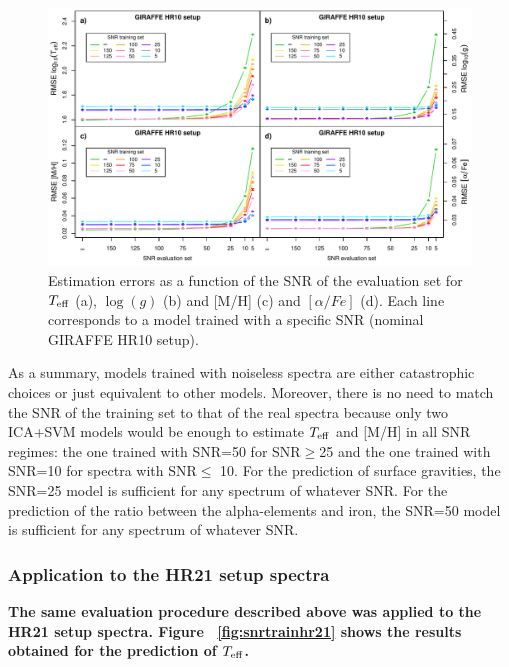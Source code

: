 \documentclass[a4paper,fleqn,usenatbib]{mnras}
\begin{document}
{{{\begin{figure}
\centering\includegraphics[width=\textwidth]{snr_errors_log_global_2x2.pdf}
\caption{Estimation errors as a function of the SNR of the evaluation
  set for $T_{\rm eff}$ (a), $\log(g)$ (b) and [M/H] (c) and
  $\left[ \alpha/Fe \right]$ (d). Each line corresponds to a model 
  trained with a specific SNR (nominal GIRAFFE HR10 setup).}
\label{fig:snrtrain}
\end{figure}

As a summary, models trained with noiseless spectra are either 
catastrophic choices or just equivalent to other models. Moreover, 
there is no need to match the SNR of the training set to that of the 
real spectra because only two ICA+SVM models would be enough to 
estimate $T_{\rm eff}$ and [M/H] in all SNR regimes: the one trained 
with SNR=50 for SNR$\ge$25 and the one trained with SNR=10 for spectra 
with SNR$\le$ 10. For the prediction of surface gravities, the SNR=25 model 
is sufficient for any spectrum of whatever SNR. For the prediction of 
the ratio between the alpha-elements and iron, the SNR=50 model is 
sufficient for any spectrum of whatever SNR.


\subsubsection{{\bf Application to the HR21 setup spectra}}

{\bf The same evaluation procedure described above was applied to the 
HR21 setup spectra. Figure ~\ref{fig:snrtrainhr21} 
shows the results obtained for the prediction of $T_{\rm eff}$.}

}}}
\end{document}
